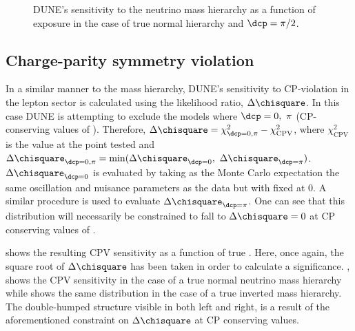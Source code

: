 \begin{figure}[h]
	\begin{adjustbox}{max totalsize=.6\linewidth, center}
		
	\end{adjustbox}
	\caption[DUNE's sensitivity to the neutrino mass hierarchy as a function of exposure]{DUNE's sensitivity to the neutrino mass hierarchy as a function of exposure in the case of true normal hierarchy and $\dcp=\pi/2$.}
	\label{fig:mhSensExp}
\end{figure}

\subsection{Charge-parity symmetry violation}
\label{sec:dune_lbl:sensitivities:cpv}

In a similar manner to the mass hierarchy, DUNE's sensitivity to CP-violation in the lepton sector is calculated using the likelihood ratio, $\Delta \chisquare$.
In this case DUNE is attempting to exclude the models where $\dcp = 0,~\pi$ (CP-conserving values of \dcp).
Therefore, $\Delta \chisquare = \chi^{2}_{\dcp=0,\pi} - \chi^{2}_{\text{CPV}}$, where $\chi^{2}_{\text{CPV}}$ is the \chisquare value at the \dcp point tested and $\Delta \chisquare_{\dcp=0,\pi} = \min(\Delta \chisquare_{\dcp=0},~\Delta \chisquare_{\dcp=\pi})$.
$\Delta \chisquare_{\dcp=0}$ is evaluated by taking as the Monte Carlo expectation the same oscillation and nuisance parameters as the data but with \dcp fixed at 0.
A similar procedure is used to evaluate $\Delta \chisquare_{\dcp=\pi}$.
One can see that this distribution will necessarily be constrained to fall to $\Delta \chisquare = 0$ at CP conserving values of \dcp.

 shows the resulting CPV sensitivity as a function of true \dcp.
Here, once again, the square root of $\Delta\chisquare$ has been taken in order to calculate a significance.
, shows the CPV sensitivity in the case of a true normal neutrino mass hierarchy while  shows the same distribution in the case of a true inverted mass hierarchy.
The double-humped structure visible in both  left and right, is a result of the aforementioned constraint on $\Delta\chisquare$ at CP conserving values.


